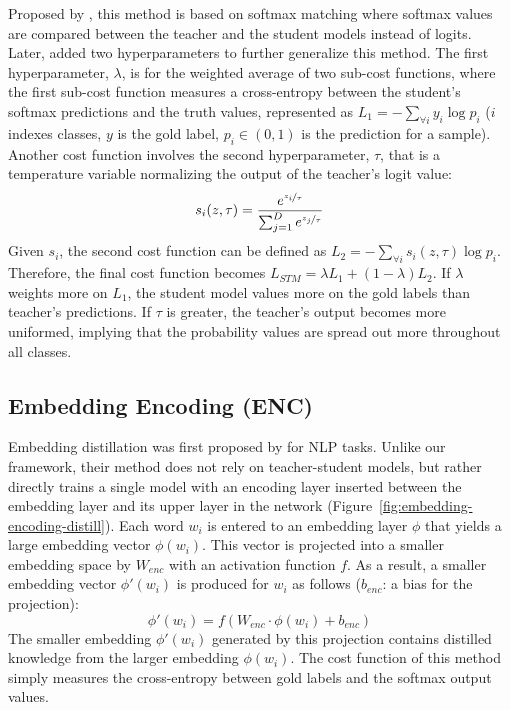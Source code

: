 \documentclass{article}
\begin{document}
Proposed by \cite{hinton2015distilling}, this method is based on softmax matching where softmax values are compared between the teacher and the student models instead of logits.
Later, \cite{hinton2015distilling} added two hyperparameters to further generalize this method.
The first hyperparameter, $\lambda$, is for the weighted average of two sub-cost functions, where the first sub-cost function measures a cross-entropy between the student's softmax predictions and the truth values, represented as $L_{1} = -\sum_{\forall i}  y_{i}\log{p_{i}}$ ($i$  indexes classes, $y$ is the gold label, $p_{i} \in (0,1)$ is the prediction for a sample).
Another cost function involves the second hyperparameter, $\tau$, that is a temperature variable normalizing the output of the teacher's logit value:
\vspace{-1ex}
$$s_i(z,\tau) = \frac{ e^{\nicefrac{z_i}{\tau}} }{\sum_{j=1}^D e^{\nicefrac{z_j}{\tau}}}$$
\noindent Given $s_i$, the second cost function can be defined as $L_{2} = -\sum_{\forall i}  s_{i}(z,\tau) \log{p_{i}}$.
Therefore, the final cost function becomes $L_{STM} = \lambda L_{1} + (1-\lambda) L_{2}$.
If $\lambda$ weights more on $L_1$, the student model values more on the gold labels than teacher's predictions.
If $\tau$ is greater, the teacher's output becomes more uniformed, implying that the probability values are spread out more throughout all classes.

\subsection{Embedding Encoding (ENC)}
\label{ssec:enc}

Embedding distillation was first proposed by \cite{mou2016distilling} for NLP tasks.
Unlike our framework, their method does not rely on teacher-student models, but rather directly trains a single model with an encoding layer inserted between the embedding layer and its upper layer in the network (Figure~\ref{fig:embedding-encoding-distill}).
Each word $w_i$ is entered to an embedding layer $\phi$ that yields a large embedding vector $\phi(w_i)$.
This vector is projected into a smaller embedding space by $W_{enc}$ with an activation function $f$.
As a result, a smaller embedding vector $\phi'(w_i)$ is produced for $w_i$ as follows ($b_{enc}$: a bias for the projection):
$$\phi'(w_i) = f(W_{enc} \cdot \phi (w_i)+ b_{enc})$$
The smaller embedding $\phi'(w_i)$ generated by this projection contains distilled knowledge from the larger embedding $\phi(w_i)$.
The cost function of this method simply measures the cross-entropy between gold labels and
the softmax output values.
\end{document}
